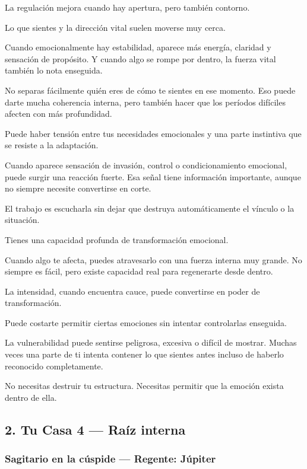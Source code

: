 \documentclass[11pt,a4paper]{article}
\begin{document}
La regulación mejora cuando hay apertura, pero también contorno.

Lo que sientes y la dirección vital suelen moverse muy cerca.

Cuando emocionalmente hay estabilidad, aparece más energía, claridad y sensación de propósito. Y cuando algo se rompe por dentro, la fuerza vital también lo nota enseguida.

No separas fácilmente quién eres de cómo te sientes en ese momento. Eso puede darte mucha coherencia interna, pero también hacer que los períodos difíciles afecten con más profundidad.

Puede haber tensión entre tus necesidades emocionales y una parte instintiva que se resiste a la adaptación.

Cuando aparece sensación de invasión, control o condicionamiento emocional, puede surgir una reacción fuerte. Esa señal tiene información importante, aunque no siempre necesite convertirse en corte.

El trabajo es escucharla sin dejar que destruya automáticamente el vínculo o la situación.

Tienes una capacidad profunda de transformación emocional.

Cuando algo te afecta, puedes atravesarlo con una fuerza interna muy grande. No siempre es fácil, pero existe capacidad real para regenerarte desde dentro.

La intensidad, cuando encuentra cauce, puede convertirse en poder de transformación.

Puede costarte permitir ciertas emociones sin intentar controlarlas enseguida.

La vulnerabilidad puede sentirse peligrosa, excesiva o difícil de mostrar. Muchas veces una parte de ti intenta contener lo que sientes antes incluso de haberlo reconocido completamente.

No necesitas destruir tu estructura. Necesitas permitir que la emoción exista dentro de ella.

\subsection{2. Tu Casa 4 — Raíz interna}

\subsubsection*{Sagitario en la cúspide — Regente: Júpiter}
\end{document}
